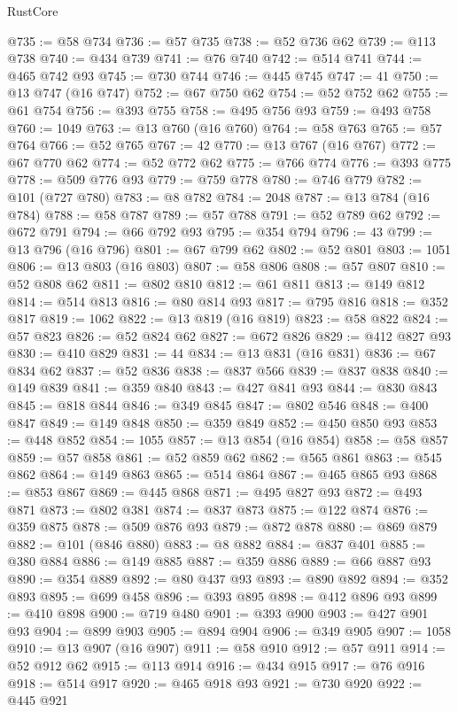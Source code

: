 \begin{lexlean}{RustCore}
\begin{coremodule}
@735 := @58 @734
@736 := @57 @735
@738 := @52 @736 @62
@739 := @113 @738
@740 := @434 @739
@741 := @76 @740
@742 := @514 @741
@744 := @465 @742 @93
@745 := @730 @744
@746 := @445 @745
@747 := 41
@750 := @13 @747 (@16 @747)
@752 := @67 @750 @62
@754 := @52 @752 @62
@755 := @61 @754
@756 := @393 @755
@758 := @495 @756 @93
@759 := @493 @758
@760 := 1049
@763 := @13 @760 (@16 @760)
@764 := @58 @763
@765 := @57 @764
@766 := @52 @765
@767 := 42
@770 := @13 @767 (@16 @767)
@772 := @67 @770 @62
@774 := @52 @772 @62
@775 := @766 @774
@776 := @393 @775
@778 := @509 @776 @93
@779 := @759 @778
@780 := @746 @779
@782 := @101 (@727 @780)
@783 := @8 @782
@784 := 2048
@787 := @13 @784 (@16 @784)
@788 := @58 @787
@789 := @57 @788
@791 := @52 @789 @62
@792 := @672 @791
@794 := @66 @792 @93
@795 := @354 @794
@796 := 43
@799 := @13 @796 (@16 @796)
@801 := @67 @799 @62
@802 := @52 @801
@803 := 1051
@806 := @13 @803 (@16 @803)
@807 := @58 @806
@808 := @57 @807
@810 := @52 @808 @62
@811 := @802 @810
@812 := @61 @811
@813 := @149 @812
@814 := @514 @813
@816 := @80 @814 @93
@817 := @795 @816
@818 := @352 @817
@819 := 1062
@822 := @13 @819 (@16 @819)
@823 := @58 @822
@824 := @57 @823
@826 := @52 @824 @62
@827 := @672 @826
@829 := @412 @827 @93
@830 := @410 @829
@831 := 44
@834 := @13 @831 (@16 @831)
@836 := @67 @834 @62
@837 := @52 @836
@838 := @837 @566
@839 := @837 @838
@840 := @149 @839
@841 := @359 @840
@843 := @427 @841 @93
@844 := @830 @843
@845 := @818 @844
@846 := @349 @845
@847 := @802 @546
@848 := @400 @847
@849 := @149 @848
@850 := @359 @849
@852 := @450 @850 @93
@853 := @448 @852
@854 := 1055
@857 := @13 @854 (@16 @854)
@858 := @58 @857
@859 := @57 @858
@861 := @52 @859 @62
@862 := @565 @861
@863 := @545 @862
@864 := @149 @863
@865 := @514 @864
@867 := @465 @865 @93
@868 := @853 @867
@869 := @445 @868
@871 := @495 @827 @93
@872 := @493 @871
@873 := @802 @381
@874 := @837 @873
@875 := @122 @874
@876 := @359 @875
@878 := @509 @876 @93
@879 := @872 @878
@880 := @869 @879
@882 := @101 (@846 @880)
@883 := @8 @882
@884 := @837 @401
@885 := @380 @884
@886 := @149 @885
@887 := @359 @886
@889 := @66 @887 @93
@890 := @354 @889
@892 := @80 @437 @93
@893 := @890 @892
@894 := @352 @893
@895 := @699 @458
@896 := @393 @895
@898 := @412 @896 @93
@899 := @410 @898
@900 := @719 @480
@901 := @393 @900
@903 := @427 @901 @93
@904 := @899 @903
@905 := @894 @904
@906 := @349 @905
@907 := 1058
@910 := @13 @907 (@16 @907)
@911 := @58 @910
@912 := @57 @911
@914 := @52 @912 @62
@915 := @113 @914
@916 := @434 @915
@917 := @76 @916
@918 := @514 @917
@920 := @465 @918 @93
@921 := @730 @920
@922 := @445 @921

\end{coremodule}
\end{lexlean}

